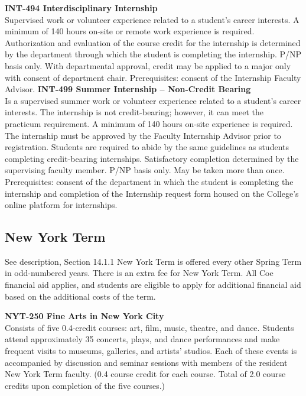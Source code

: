 \documentclass[
  letterpaper,
]{scrbook}
\begin{document}
\textbf{INT-494 Interdisciplinary Internship}\\
Supervised work or volunteer experience related to a student's career
interests. A minimum of 140 hours on-site or remote work experience is
required. Authorization and evaluation of the course credit for the
internship is determined by the department through which the student is
completing the internship. P/NP basis only. With departmental approval,
credit may be applied to a major only with consent of department chair.
Prerequisites: consent of the Internship Faculty Advisor.
\textbf{INT-499 Summer Internship -- Non-Credit Bearing}\\
Is a supervised summer work or volunteer experience related to a
student's career interests. The internship is not credit-bearing;
however, it can meet the practicum requirement. A minimum of 140 hours
on-site experience is required. The internship must be approved by the
Faculty Internship Advisor prior to registration. Students are required
to abide by the same guidelines as students completing credit-bearing
internships. Satisfactory completion determined by the supervising
faculty member. P/NP basis only. May be taken more than once.
Prerequisites: consent of the department in which the student is
completing the internship and completion of the Internship request form
housed on the College's online platform for internships.

\subsection{New York Term}\label{sec-academic-programs-ny-term}

See description, Section 14.1.1 New York Term is offered every other
Spring Term in odd-numbered years. There is an extra fee for New York
Term. All Coe financial aid applies, and students are eligible to apply
for additional financial aid based on the additional costs of the term.

\textbf{NYT-250 Fine Arts in New York City}\\
Consists of five 0.4-credit courses: art, film, music, theatre, and
dance. Students attend approximately 35 concerts, plays, and dance
performances and make frequent visits to museums, galleries, and
artists' studios. Each of these events is accompanied by discussion and
seminar sessions with members of the resident New York Term faculty.
(0.4 course credit for each course. Total of 2.0 course credits upon
completion of the five courses.)
\end{document}
